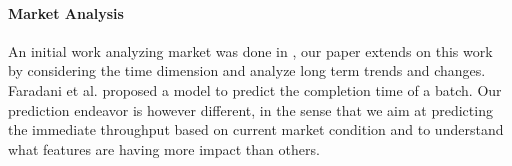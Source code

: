 \paragraph{Market Analysis}
An initial work analyzing \amt{} market was done in \cite{mturk}, our paper extends on this work by considering the time dimension and analyze long term trends and changes.
Faradani et al. \cite{faradani2011s} proposed a model to predict the completion time of a batch. Our prediction endeavor is however different, in the sense that we aim at predicting the immediate throughput based on current market condition and  to understand what features are having more impact than others.

%
%


